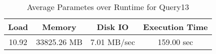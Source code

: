\documentclass[../../main.tex]{subfiles}
\begin{document}
    \begin{table}
        \begin{center}
            \begin{tabular}{ |c|c|c|c| } 
            \hline
            Load & Memory & Disk IO & Execution Time\\
            \hline
            10.92 & 33825.26 MB & 7.01 MB/sec & 159.00 sec \\
            \hline
            \end{tabular}
            \\[1pt]
            \caption{Average Parametes over Runtime for Query13}
        \end{center}
    \end{table}
    \pagebreak
\end{document}
